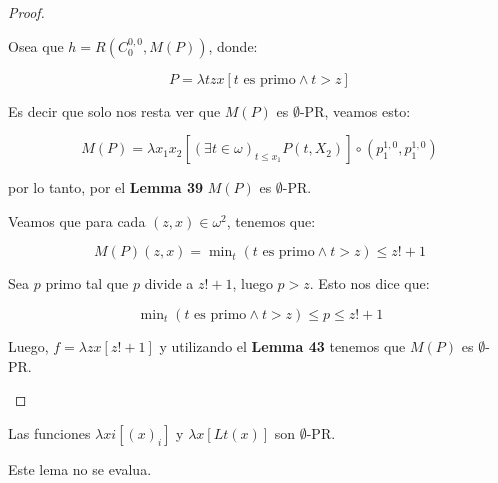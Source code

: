 \begin{proof}
\begin{enumerate}[a)]
        \par Osea que $h = R \left(C_{0}^{0,0},M(P)\right)$, donde:

        \[
          P = \lambda tzx\left[t \text{ es primo} \wedge t > z\right]
        \]

        \par Es decir que solo nos resta ver que $M(P)$ es $\emptyset$-PR, veamos esto:

        \[
          M(P) = \lambda x_{1} x_{2} \left[(\exists t \in \omega)_{t \leq x_{1}} P(t, X_{2})\right] \circ (p_{1}^{1,0},
          p_{1}^{1,0})
        \]

        \par por lo tanto, por el \textbf{Lemma 39} $M(P)$ es $\emptyset$-PR.

        \par Veamos que para cada $(z,x) \in \omega^{2}$, tenemos que:

        \[
          M(P)(z,x) = \min\nolimits_{t}\left(t \text{ es primo} \wedge t > z\right) \leq z! + 1
        \]

        \par Sea $p$ primo tal que $p$ divide a $z!+1$, luego $p > z$. Esto nos dice que:

        \[
          \min\nolimits_{t}\left(t \text{ es primo} \wedge t > z\right) \leq p \leq z! + 1
        \]

        \par Luego, $f = \lambda zx\left[z! + 1\right]$ y utilizando el \textbf{Lemma 43} tenemos que $M(P)$ es
        $\emptyset$-PR.
    \end{enumerate}
  \end{proof}

  \begin{lemma}
    \par Las funciones $\lambda xi\left[(x)_{i}\right]$ y $\lambda x\left[Lt(x)\right]$ son $\emptyset$-PR.
  \end{lemma}

  \begin{lemma}
    \par Este lema no se evalua.
  \end{lemma}

